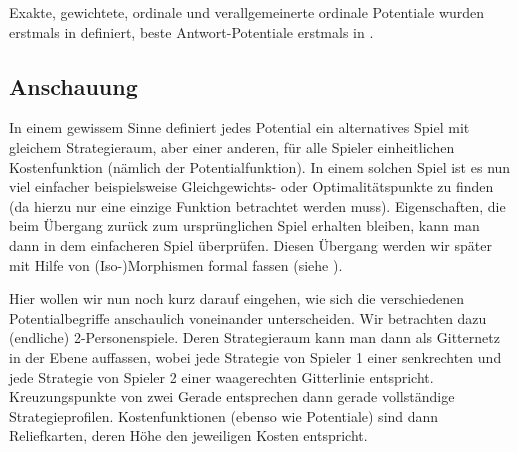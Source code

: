 Exakte, gewichtete, ordinale und verallgemeinerte ordinale Potentiale wurden erstmals in \cite{MonShap} definiert, beste Antwort-Potentiale erstmals in \cite{BestRespPot}.

\subsection{Anschauung}

In einem gewissem Sinne definiert jedes Potential ein alternatives Spiel mit gleichem Strategieraum, aber einer anderen, für alle Spieler einheitlichen Kostenfunktion (nämlich der Potentialfunktion). In einem solchen Spiel ist es nun viel einfacher beispielsweise Gleichgewichts- oder Optimalitätspunkte zu finden (da hierzu nur eine einzige Funktion betrachtet werden muss). Eigenschaften, die beim Übergang zurück zum ursprünglichen Spiel erhalten bleiben, kann man dann in dem einfacheren Spiel überprüfen. Diesen Übergang werden wir später mit Hilfe von (Iso-)Morphismen formal fassen (siehe ).

Hier wollen wir nun noch kurz darauf eingehen, wie sich die verschiedenen Potentialbegriffe anschaulich voneinander unterscheiden. Wir betrachten dazu (endliche) 2-Personenspiele. Deren Strategieraum kann man dann als Gitternetz in der Ebene auffassen, wobei jede Strategie von Spieler 1 einer senkrechten und jede Strategie von Spieler 2 einer waagerechten Gitterlinie entspricht. Kreuzungspunkte von zwei Gerade entsprechen dann gerade vollständige Strategieprofilen. Kostenfunktionen (ebenso wie Potentiale) sind dann \glqq Reliefkarten\grqq{}, deren Höhe den jeweiligen Kosten entspricht. 

